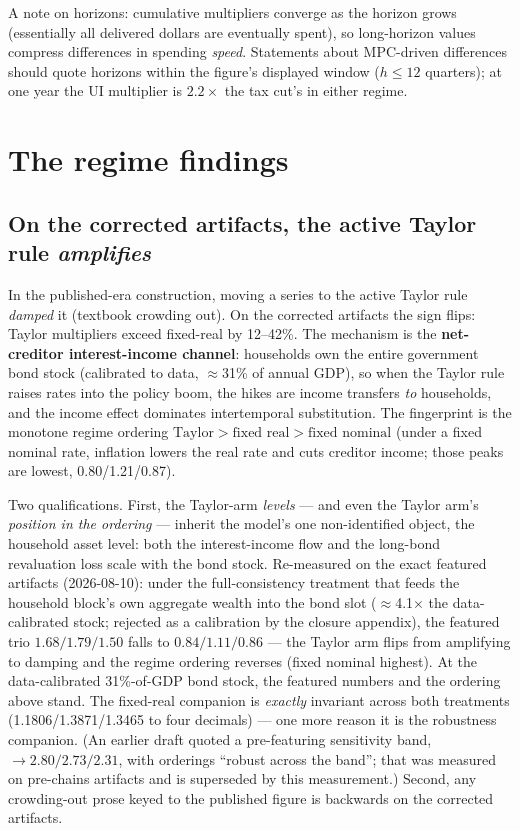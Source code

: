 \documentclass[11pt]{article}
\begin{document}
A note on horizons: cumulative multipliers converge as the horizon grows
(essentially all delivered dollars are eventually spent), so long-horizon
values compress differences in spending \emph{speed}. Statements about
MPC-driven differences should quote horizons within the figure's
displayed window ($h\le 12$ quarters); at one year the UI multiplier is
$2.2\times$ the tax cut's in either regime.

\section{The regime findings}
\label{sec:regime}

\subsection{On the corrected artifacts, the active Taylor rule
\emph{amplifies}}

In the published-era construction, moving a series to the active Taylor
rule \emph{damped} it (textbook crowding out). On the corrected
artifacts the sign flips: Taylor multipliers exceed fixed-real by
12--42\%. The mechanism is the \textbf{net-creditor interest-income
channel}: households own the entire government bond stock (calibrated to
data, $\approx$31\% of annual GDP), so when the Taylor rule raises rates
into the policy boom, the hikes are income transfers \emph{to}
households, and the income effect dominates intertemporal substitution.
The fingerprint is the monotone regime ordering
$\text{Taylor} > \text{fixed real} > \text{fixed nominal}$
(under a fixed nominal rate, inflation lowers the real rate and cuts
creditor income; those peaks are lowest, 0.80/1.21/0.87).

Two qualifications. First, the Taylor-arm \emph{levels} --- and even
the Taylor arm's \emph{position in the ordering} --- inherit the
model's one non-identified object, the household asset level: both the
interest-income flow and the long-bond revaluation loss scale with the
bond stock. Re-measured on the exact featured artifacts (2026-08-10):
under the full-consistency treatment that feeds the household block's
own aggregate wealth into the bond slot ($\approx$4.1$\times$ the
data-calibrated stock; rejected as a calibration by the closure
appendix), the featured trio $1.68/1.79/1.50$ falls to
$0.84/1.11/0.86$ --- the Taylor arm flips from amplifying to damping
and the regime ordering reverses (fixed nominal highest). At the
data-calibrated 31\%-of-GDP bond stock, the featured numbers and the
ordering above stand. The fixed-real companion is \emph{exactly}
invariant across both treatments (1.1806/1.3871/1.3465 to four
decimals) --- one more reason it is the robustness companion. (An
earlier draft quoted a pre-featuring sensitivity band,
$\rightarrow 2.80/2.73/2.31$, with orderings ``robust across the
band''; that was measured on pre-chains artifacts and is superseded
by this measurement.) Second, any crowding-out prose
keyed to the published figure is backwards on the corrected artifacts.
\end{document}
